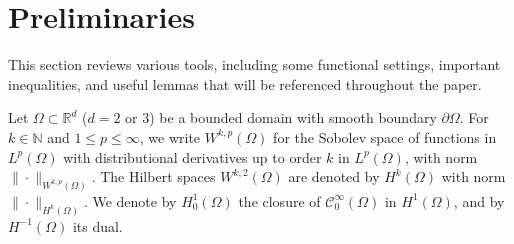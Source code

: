 \documentclass[11pt]{article}
\newtheorem{theorem}{Theorem}[section]
\numberwithin{equation}{section}
\begin{document}
\section{Preliminaries} This section reviews various tools, including some  functional settings,  important inequalities,  and useful lemmas that will be referenced throughout the paper.

Let $\Omega \subset \mathbb{R}^d$ ($d=2$ or $3$) be a bounded domain with smooth boundary $\partial \Omega$.
For $k \in \mathbb{N}$ and $1 \leq p \leq \infty$, we write $W^{k,p}(\Omega)$ for the Sobolev space of functions in $L^p(\Omega)$ with distributional derivatives up to order $k$ in $L^p(\Omega)$, with norm $\| \cdot \|_{W^{k,p}(\Omega)}$.
The Hilbert spaces $W^{k,2}(\Omega)$ are denoted by $H^k(\Omega)$ with norm $\| \cdot \|_{H^k(\Omega)}$.
We denote by $H_0^1(\Omega)$ the closure of $\mathcal{C}_0^\infty(\Omega)$ in $H^1(\Omega)$, and by $H^{-1}(\Omega)$ its dual.
\end{document}
